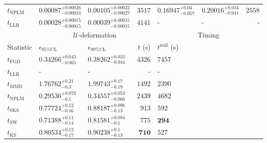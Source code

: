 \begin{tabular}{l|llr|llr}
\rowcolor{red!35}	$t_{\mathrm{NPLM}}$ & $0.00087_{-0.00033}^{+0.00026}$ & $0.00105_{-0.00027}^{+0.00022}$ & $3517$ & $0.16947_{-0.057}^{+0.04}$ & $0.20016_{-0.041}^{+0.034}$ & $2558$ \\
	$t_{\mathrm{LLR}}$ & $0.00028_{-0.00015}^{+0.00015}$ & $0.00039_{-0.00015}^{+0.00015}$ & $4141$ & - & - & - \\
	\toprule
	\multicolumn{1}{c}{} & \multicolumn{3}{c}{$\mathcal{U}$-deformation} & \multicolumn{3}{c}{Timing} \\
	Statistic & $\epsilon_{95\%\mathrm{CL}}$ & $\epsilon_{99\%\mathrm{CL}}$ & $t$ (s) & $t^{\mathrm{null}}$ (s) \\
	\midrule
	$t_{\mathrm{FGD}}$ & ${\mathbf{0.34266_{-0.065}^{+0.043}}}$ & ${\mathbf{0.38262_{-0.044}^{+0.033}}}$ & $4326$ & $7457$ \\
	$t_{\mathrm{LLR}}$ & - & - & - & - \\
	$t_{\mathrm{MMD}}$ & $1.76762_{-0.3}^{+0.21}$ & $1.99743_{-0.19}^{+0.17}$ & $1492$ & $2390$ \\
\rowcolor{red!35}	$t_{\mathrm{NPLM}}$ & $0.29536_{-0.1}^{+0.073}$ & $0.34557_{-0.066}^{+0.053}$ & $2439$ & $4682$ \\
	$t_{\mathrm{SKS}}$ & $0.77724_{-0.16}^{+0.12}$ & $0.88187_{-0.13}^{+0.098}$ & $913$ & $592$ \\
	$t_{\mathrm{SW}}$ & $0.71388_{-0.14}^{+0.11}$ & $0.81581_{-0.1}^{+0.084}$ & $775$ & ${\mathbf{294}}$ \\
	$t_{\overline{\mathrm{KS}}}$ & $0.80534_{-0.17}^{+0.12}$ & $0.90238_{-0.13}^{+0.1}$ & ${\mathbf{710}}$ & $527$ \\
	\bottomrule
\end{tabular}